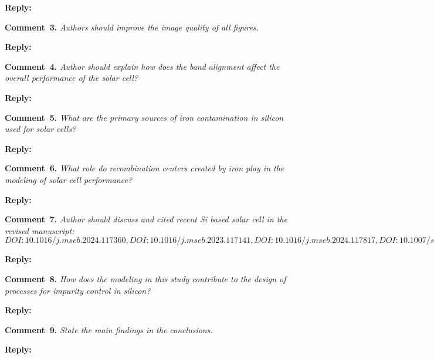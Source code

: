 \documentclass[a4paper,fleqn]{cas-sc}
\begin{document}
\noindent
\textcolor[rgb]{0.51,0.00,0.00}{\textbf{Reply:}}




\noindent
\textcolor[rgb]{0.00,0.50,1.00}{\textbf{Comment~3.}}
\emph{Authors should improve the image quality of all figures.}

\noindent
\textcolor[rgb]{0.51,0.00,0.00}{\textbf{Reply:}}




\noindent
\textcolor[rgb]{0.00,0.50,1.00}{\textbf{Comment~4.}}
\emph{Author should explain how does the band alignment affect the overall performance of the solar cell?}

\noindent
\textcolor[rgb]{0.51,0.00,0.00}{\textbf{Reply:}}




\noindent
\textcolor[rgb]{0.00,0.50,1.00}{\textbf{Comment~5.}}
\emph{What are the primary sources of iron contamination in silicon used for solar cells?}

\noindent
\textcolor[rgb]{0.51,0.00,0.00}{\textbf{Reply:}}




\noindent
\textcolor[rgb]{0.00,0.50,1.00}{\textbf{Comment~6.}}
\emph{What role do recombination centers created by iron play in the modeling of solar cell performance?}

\noindent
\textcolor[rgb]{0.51,0.00,0.00}{\textbf{Reply:}}




\noindent
\textcolor[rgb]{0.00,0.50,1.00}{\textbf{Comment~7.}}
\emph{Author should discuss and cited recent Si based solar cell in the revised manuscript: $DOI:10.1016/j.mseb.2024.117360, DOI:10.1016/j.mseb.2023.117141, DOI:10.1016/j.mseb.2024.117817, DOI:10.1007/s42247-024-00821-y, DOI:10.1016/j.inoche.2024.112785$}

\noindent
\textcolor[rgb]{0.51,0.00,0.00}{\textbf{Reply:}}




\noindent
\textcolor[rgb]{0.00,0.50,1.00}{\textbf{Comment~8.}}
\emph{How does the modeling in this study contribute to the design of processes for impurity control in silicon?}

\noindent
\textcolor[rgb]{0.51,0.00,0.00}{\textbf{Reply:}}




\noindent
\textcolor[rgb]{0.00,0.50,1.00}{\textbf{Comment~9.}}
\emph{State the main findings in the conclusions.}

\noindent
\textcolor[rgb]{0.51,0.00,0.00}{\textbf{Reply:}}




\end{document}
